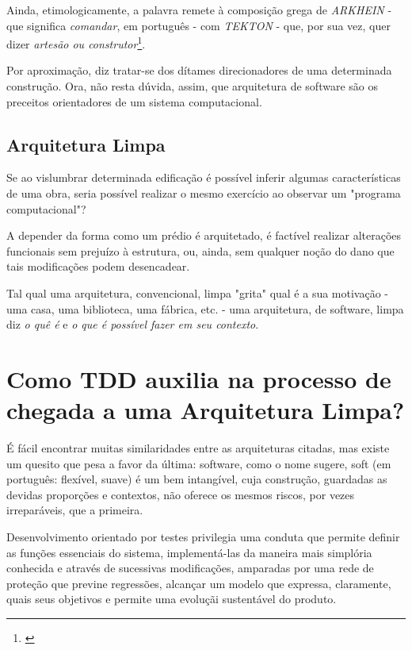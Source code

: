 \documentclass[12pt,a4paper,oneside,english,brazil]{article}
\begin{document}
    Ainda, etimologicamente, a palavra remete à composição grega de \emph{
      ARKHEIN} - que significa \emph{comandar}, em português - com \emph{TEKTON}
    - que, por sua vez, quer dizer \emph{artesão ou construtor}\footnote{\cite{
    Etimologia2019}}.

    Por aproximação, diz tratar-se dos dítames direcionadores de uma determinada
    construção. Ora, não resta dúvida, assim, que arquitetura de software são os
    preceitos orientadores de um sistema computacional.

    \subsection{Arquitetura Limpa}

      Se ao vislumbrar determinada edificação é possível inferir algumas
      características de uma obra, seria possível realizar o mesmo exercício ao
      observar um "programa computacional"?

      A depender da forma como um prédio é arquitetado, é factível realizar
      alterações funcionais sem prejuízo à estrutura, ou, ainda, sem qualquer
      noção do dano que tais modificações podem desencadear.

      Tal qual uma arquitetura, convencional, limpa "grita"\cite[p. 196]{
      Martin2018} qual é a sua motivação - uma casa, uma biblioteca, uma fábrica,
      etc. - uma arquitetura, de software,  limpa diz \emph{o quê é} e \emph{o
      que é possível fazer em seu contexto}.

  \section{Como TDD auxilia na processo de chegada a uma Arquitetura Limpa?}

    É fácil encontrar muitas similaridades entre as arquiteturas citadas, mas
    existe um quesito que pesa a favor da última: software, como o nome sugere,
    soft (em português: flexível, suave) é um bem intangível, cuja construção,
    guardadas as devidas proporções e contextos, não oferece os mesmos riscos,
    por vezes irreparáveis, que a primeira.

    Desenvolvimento orientado por testes privilegia uma conduta que permite
    definir as funções essenciais do sistema, implementá-las da maneira mais
    simplória conhecida e através de sucessivas modificações, amparadas por uma
    rede de proteção que previne regressões, alcançar um modelo que expressa,
    claramente, quais seus objetivos e permite uma evoluçãi sustentável do
    produto.
\end{document}
